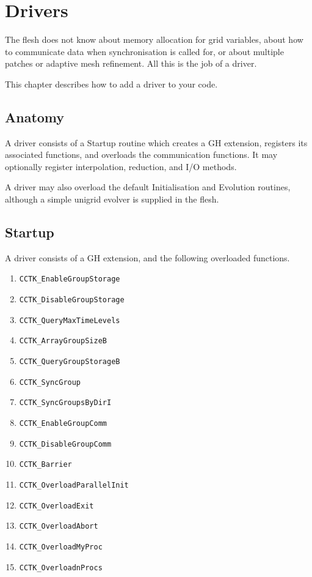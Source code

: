 \section{Drivers}

The flesh does not know about memory allocation for grid variables, about how
to communicate data when synchronisation is called for, or about
multiple patches or adaptive mesh refinement.  All this is the job of a driver.

This chapter describes how to add a driver to your code.

\subsection{Anatomy}

A driver consists of a Startup routine which creates a GH extension, 
registers its associated functions, and overloads the communication functions.
It may optionally register interpolation, reduction, and I/O methods.

A driver may also overload the default Initialisation and Evolution routines,
although a simple unigrid evolver is supplied in the flesh.

\subsection{Startup}

A driver consists of a GH extension, and the following overloaded
functions.

\begin{enumerate}
\item{} {\tt CCTK\_EnableGroupStorage}
\item{} {\tt CCTK\_DisableGroupStorage}
\item{} {\tt CCTK\_QueryMaxTimeLevels}
\item{} {\tt CCTK\_ArrayGroupSizeB}
\item{} {\tt CCTK\_QueryGroupStorageB}
\item{} {\tt CCTK\_SyncGroup}
\item{} {\tt CCTK\_SyncGroupsByDirI}
\item{} {\tt CCTK\_EnableGroupComm}
\item{} {\tt CCTK\_DisableGroupComm}
\item{} {\tt CCTK\_Barrier}
\item{} {\tt CCTK\_OverloadParallelInit}
\item{} {\tt CCTK\_OverloadExit}
\item{} {\tt CCTK\_OverloadAbort}
\item{} {\tt CCTK\_OverloadMyProc}
\item{} {\tt CCTK\_OverloadnProcs}
\end{enumerate}


